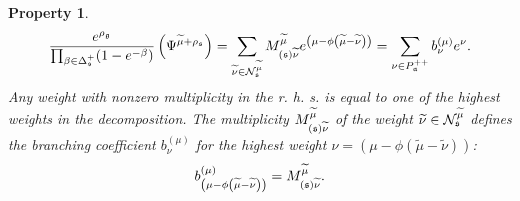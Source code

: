 \documentclass[12pt]{article}
\newtheorem{Prop}[Def]{Property}
\begin{document}
\begin{Prop}
\begin{equation}
\frac{e^{\rho _{\frak{g}}}}{\prod_{\beta \in \Delta _{\frak{s}%
}^{+}}(1-e^{-\beta })}\left( \Psi ^{\widetilde{\mu }+\rho _{\frak{s}%
}}\right) =\sum_{\widetilde{\nu }\in \mathcal{N}_{\frak{s}}^{\widetilde{\mu }%
}}M_{\left( \frak{s}\right) \widetilde{\nu }}^{\widetilde{\mu }}e^{\left(
\mu -\phi \left( \widetilde{\mu }-\widetilde{\nu }\right) \right)
}=\sum_{\nu \in P_{\frak{a}}^{++}}b_{\nu }^{(\mu )}e^{\nu }.
\label{singular main-4}
\end{equation}
Any weight with nonzero multiplicity in the r. h. s. is equal to one of the
highest weights in the decomposition. The multiplicity $M_{\left( \frak{s}%
\right) \widetilde{\nu }}^{\widetilde{\mu }}$ of the weight  $\widetilde{\nu
}\in \mathcal{N}_{\frak{s}}^{\widetilde{\mu }}$ defines the branching
coefficient $b_{\nu }^{(\mu )}$ for the highest weight $\nu =\left( \mu
-\phi \left( \widetilde{\mu }-\widetilde{\nu }\right) \right) $:
\[
b_{\left( \mu -\phi \left( \widetilde{\mu }-\widetilde{\nu }\right) \right)
}^{(\mu )}=M_{\left( \frak{s}\right) \widetilde{\nu }}^{\widetilde{\mu }}.
\]
\end{Prop}
\end{document}
